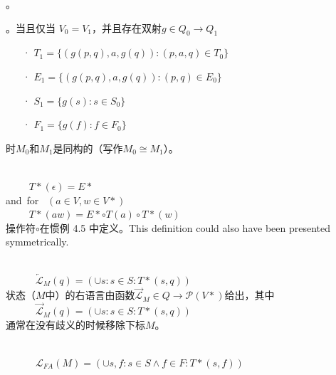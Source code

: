 {{。
\newline

。当且仅当 $V_0=V_1$，并且存在双射$g\in Q_0 \longrightarrow Q_1$ 

\begin{itemize}
    \item[·] $T_1 = \{ (g(p,q),a,g(q)) : (p,a,q) \in T_0 \}$
    \item[·] $E_1 = \{ (g(p,q),a,g(q)) : (p,q) \in E_0\}$
    \item[·] $S_1 = \{ g(s):s\in S_0 \}$
    \item[·] $F_1 = \{ g(f):f\in F_0 \}$
\end{itemize}
时$M_0$和$M_1$是同构的（写作$M_0 \cong M_1$）。
\newline

 \\
\mbox{　　} $T*(\epsilon) = E*$ \\
\mbox{and for } $(a\in V,w\in V*)$ \\
\mbox{　　} $ T*(aw) = E* \circ T(a) \circ T*(w) $ \\
操作符$\circ$在惯例 4.5 中定义。This definition could also have been presented symmetrically.
\newline

\newline

 \\
\mbox{　　}　$ \overleftarrow{\mathcal{L}}_M (q) = ( \cup s:s \in S : T*(s,q) ) $ \\
状态（$M$中）的右语言由函数$ \overrightarrow{\mathcal{L}} _M \in Q \longrightarrow \mathcal{P}(V*)$给出，其中 \\
\mbox{　　}　$ \overrightarrow{\mathcal{L}}_M (q) = ( \cup s:s \in S : T*(s,q) ) $ \\
通常在没有歧义的时候移除下标$M$。
\newline

 \\
\mbox{　　}　$ \mathcal{L}_{FA} (M) = (\cup s,f:s \in S \land f \in F : T* (s,f)) $ \\

}}
